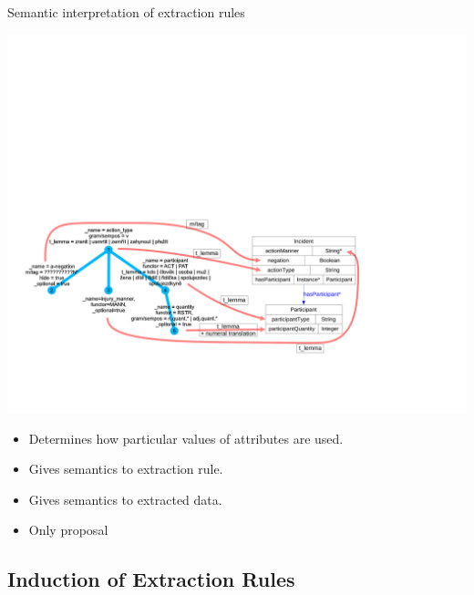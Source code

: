 \documentclass[xcolor=dvipsnames]{beamer}
\begin{document}
\begin{frame}{Semantic interpretation of extraction rules}
\begin{center}
\includegraphics[width=0.55\vsize, angle=-90]{img/semantic_interpretation}
\end{center}
\begin{itemize}
	\item Determines how particular values of attributes are used.
	\item Gives semantics to extraction rule.
	\item Gives semantics to extracted data.
	\item Only proposal
\end{itemize}
\end{frame}


\subsection{Induction of Extraction Rules}
\end{document}
